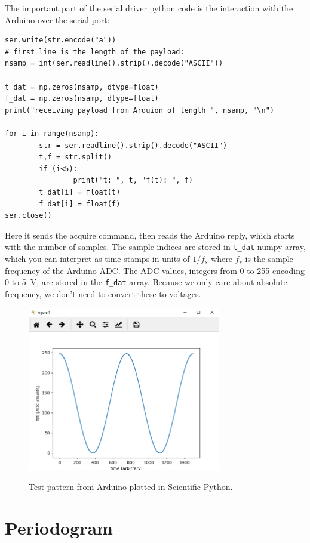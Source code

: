 \documentclass[12pt]{article}
\begin{document}
The important part of the serial driver python code is the interaction with the Arduino over the serial port:
\begin{verbatim}
ser.write(str.encode("a"))
# first line is the length of the payload:
nsamp = int(ser.readline().strip().decode("ASCII"))

t_dat = np.zeros(nsamp, dtype=float)
f_dat = np.zeros(nsamp, dtype=float)
print("receiving payload from Arduion of length ", nsamp, "\n")

for i in range(nsamp):
        str = ser.readline().strip().decode("ASCII")
        t,f = str.split()
        if (i<5):
                print("t: ", t, "f(t): ", f)
        t_dat[i] = float(t)
        f_dat[i] = float(f)
ser.close()
\end{verbatim}
Here it sends the acquire command, then reads the Arduino reply, which starts with the number of samples.  The sample indices are stored in {\tt t\_dat} numpy array, which you can interpret as time stamps in units of $1/f_s$ where $f_s$ is the sample frequency of the Arduino ADC.  The ADC values, integers from 0 to 255 encoding 0 to 5~V, are stored in the {\tt f\_dat} array.  Because we only care about absolute frequency, we don't need to convert these to voltages.
  
\begin{figure}[htbp]
\begin{center}
{\includegraphics[width=0.75\textwidth]{figs/testpattern.png}}
\end{center}
\caption{\label{fig:wave} Test pattern from Arduino plotted in Scientific Python.}
\end{figure}


\section{Periodogram}
\end{document}
